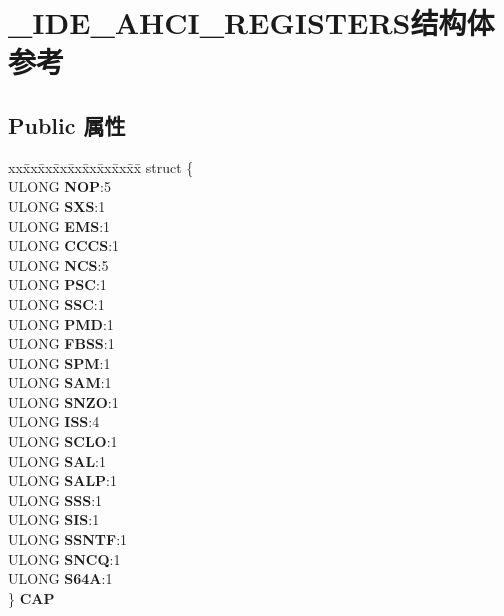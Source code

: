 \hypertarget{struct___i_d_e___a_h_c_i___r_e_g_i_s_t_e_r_s}{}\section{\+\_\+\+I\+D\+E\+\_\+\+A\+H\+C\+I\+\_\+\+R\+E\+G\+I\+S\+T\+E\+R\+S结构体 参考}
\label{struct___i_d_e___a_h_c_i___r_e_g_i_s_t_e_r_s}
\subsection*{Public 属性}
\begin{DoxyCompactItemize}
\item 
\mbox{\label{struct___i_d_e___a_h_c_i___r_e_g_i_s_t_e_r_s_a896c8ab152e0dc1d61a6d9eacbf8fd1e}} 
\begin{tabbing}
xx\=xx\=xx\=xx\=xx\=xx\=xx\=xx\=xx\=\kill
struct \{\\
\>ULONG {\bfseries NOP}:5\\
\>ULONG {\bfseries SXS}:1\\
\>ULONG {\bfseries EMS}:1\\
\>ULONG {\bfseries CCCS}:1\\
\>ULONG {\bfseries NCS}:5\\
\>ULONG {\bfseries PSC}:1\\
\>ULONG {\bfseries SSC}:1\\
\>ULONG {\bfseries PMD}:1\\
\>ULONG {\bfseries FBSS}:1\\
\>ULONG {\bfseries SPM}:1\\
\>ULONG {\bfseries SAM}:1\\
\>ULONG {\bfseries SNZO}:1\\
\>ULONG {\bfseries ISS}:4\\
\>ULONG {\bfseries SCLO}:1\\
\>ULONG {\bfseries SAL}:1\\
\>ULONG {\bfseries SALP}:1\\
\>ULONG {\bfseries SSS}:1\\
\>ULONG {\bfseries SIS}:1\\
\>ULONG {\bfseries SSNTF}:1\\
\>ULONG {\bfseries SNCQ}:1\\
\>ULONG {\bfseries S64A}:1\\
\} {\bfseries CAP}\\


\end{tabbing}
\end{DoxyCompactItemize}
